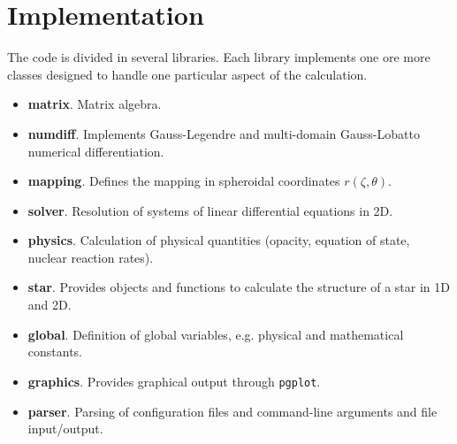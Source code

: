 \section{Implementation}
The code is divided in several libraries. Each library implements one ore more classes designed to
handle one particular aspect of the calculation. 

\begin{itemize}
\item {\bf matrix}. Matrix algebra.
\item {\bf numdiff}. Implements Gauss-Legendre and multi-domain Gauss-Lobatto
numerical differentiation.
\item {\bf mapping}. Defines the mapping in spheroidal coordinates $r(\zeta,\theta)$. 
\item {\bf solver}. Resolution of systems of linear differential equations in 2D.
\item {\bf physics}. Calculation of physical quantities (opacity, equation of state, nuclear reaction rates).
\item {\bf star}. Provides objects and functions to calculate the structure of a star in 1D and 2D.
\item {\bf global}. Definition of global variables, e.g. physical and mathematical constants.
\item {\bf graphics}. Provides graphical output through {\tt pgplot}.
\item {\bf parser}. Parsing of configuration files and command-line arguments and file input/output.
\end{itemize} 


